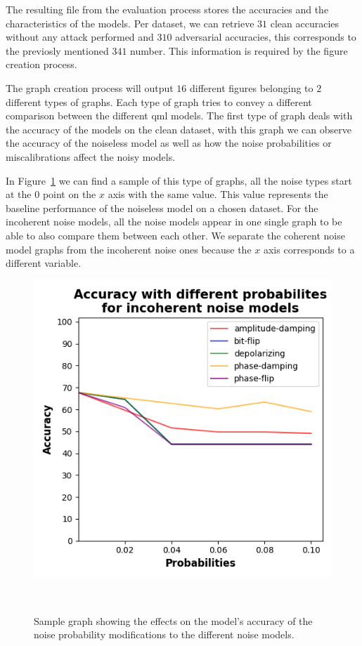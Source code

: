 The resulting file from the evaluation process stores the
accuracies and the characteristics of the models. Per dataset,
we can retrieve \(31\) clean accuracies without any attack
performed and \(310\) adversarial accuracies, this corresponds
to the previosly mentioned \(341\) number. This information
is required by the figure creation process. \

The graph creation process will output \(16\) different
figures belonging to \(2\) different types of graphs. Each
type of graph tries to convey a different comparison between
the different \ac{qml} models. The first type of graph deals
with the accuracy of the models on the clean dataset, 
with this graph we can observe the accuracy of the noiseless
model as well as how the noise probabilities or miscalibrations
affect the noisy models. \

In Figure~\ref{fig:sample-accuracy} we
can find a sample of this type of graphs, all the noise types
start at the \(0\) point on the \(x\) axis with the same value. This
value represents the baseline performance of the noiseless model
on a chosen dataset. For the incoherent noise models, all the
noise models appear in one single graph to be able to also compare
them between each other. We separate the coherent noise model graphs
from the incoherent noise ones because the \(x\) axis corresponds to
a different variable. \

\begin{figure}[h!]
  \includegraphics[scale=0.70]{figures/accuracy-graph.png}
  \centering
  \caption{Sample graph showing the effects on the model's accuracy of the noise probability modifications to the different noise models.}
~\label{fig:sample-accuracy}
\end{figure} \

